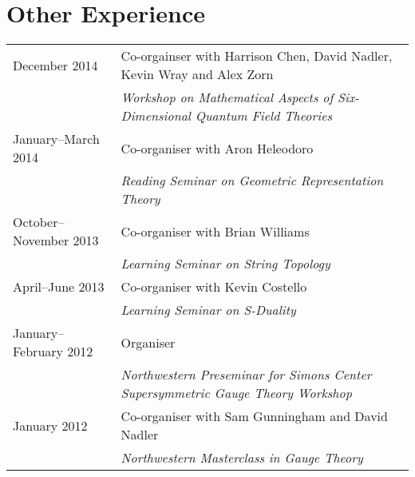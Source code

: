 \documentclass[10pt,oneside]{article}
\newcommand\T{\rule{0pt}{2.6ex}}
\begin{document}
\section*{Other Experience}
\begin{tabular}{ll}
December 2014 \T & Co-orgainser with Harrison Chen, David Nadler, Kevin Wray and Alex Zorn \\
&\emph{Workshop on Mathematical Aspects of Six-Dimensional Quantum Field Theories} \\
January--March 2014 \T & Co-organiser with Aron Heleodoro \\
&\emph{Reading Seminar on Geometric Representation Theory} \\
October--November 2013 \T & Co-organiser with Brian Williams \\
&\emph{Learning Seminar on String Topology} \\
April--June 2013 \T & Co-organiser with Kevin Costello \\
&\emph{Learning Seminar on S-Duality} \\
January--February 2012 \T & Organiser \\
&\emph{Northwestern Preseminar for Simons Center Supersymmetric Gauge Theory Workshop}\\
January 2012 \T & Co-organiser with Sam Gunningham and David Nadler \\
&\emph{Northwestern Masterclass in Gauge Theory}
\end{tabular}
\end{document}
